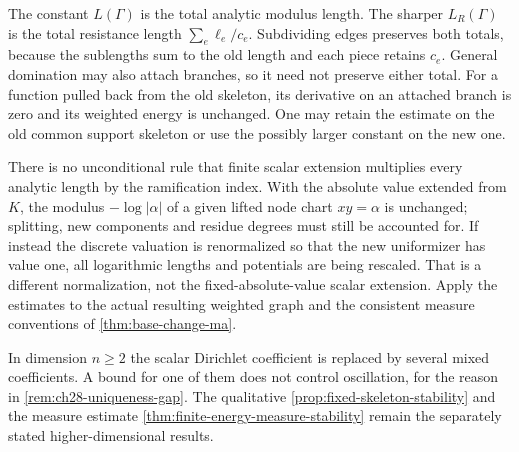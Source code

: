 \begin{remark}
\label{rem:ch28-curve-constant}
The constant \(L(\Gamma)\) is the total analytic modulus length.
The sharper \(L_R(\Gamma)\) is the total resistance length
\(\sum_e\ell_e/c_e\).  Subdividing edges preserves both totals, because
the sublengths sum to the old length and each piece retains \(c_e\).
General domination may also attach branches, so it need not preserve
either total.  For a function pulled back from the old skeleton, its
derivative on an attached branch is zero and its weighted energy is
unchanged.  One may retain the estimate on the old common support
skeleton or use the possibly larger constant on the new one.

There is no unconditional rule that finite scalar extension multiplies
every analytic length by the ramification index.  With the absolute value
extended from \(K\), the modulus \(-\log|\alpha|\) of a given lifted
node chart \(xy=\alpha\) is unchanged; splitting, new components and
residue degrees must still be accounted for.  If instead the discrete
valuation is renormalized so that the new uniformizer has value one,
all logarithmic lengths and potentials are being rescaled.  That is a
different normalization, not the fixed-absolute-value scalar extension.
Apply the estimates to the actual resulting weighted graph and the
consistent measure conventions of \cref{thm:base-change-ma}.

In dimension \(n\geq2\) the scalar Dirichlet coefficient is replaced by
several mixed coefficients.  A bound for one of them does not control
oscillation, for the reason in \cref{rem:ch28-uniqueness-gap}.
The qualitative \cref{prop:fixed-skeleton-stability} and the
measure estimate \cref{thm:finite-energy-measure-stability} remain the
separately stated higher-dimensional results.
\end{remark}
